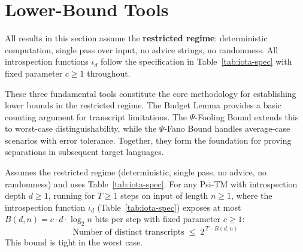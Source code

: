 
\section{Lower-Bound Tools}
\label{sec:lower-bound-tools}

\begin{remark}
All results in this section assume the \textbf{restricted regime}: deterministic computation, single pass over input, no advice strings, no randomness. All introspection functions $\iota_d$ follow the specification in Table~\ref{tab:iota-spec} with fixed parameter $c \geq 1$ throughout.
\end{remark}

These three fundamental tools constitute the core methodology for establishing lower bounds in the restricted regime. The Budget Lemma provides a basic counting argument for transcript limitations. The $\Psi$-Fooling Bound extends this to worst-case distinguishability, while the $\Psi$-Fano Bound handles average-case scenarios with error tolerance. Together, they form the foundation for proving separations in subsequent target languages.

\begin{lemma}
\label{lem:budget}\label{Lk:budget-lemma}\label{lemma:budget-9-2}
Assumes the restricted regime (deterministic, single pass, no advice, no randomness) and uses Table~\ref{tab:iota-spec}.
For any Psi-TM with introspection depth $d \geq 1$, running for $T \geq 1$ steps on input of length $n \geq 1$, where the introspection function $\iota_d$ (Table~\ref{tab:iota-spec}) exposes at most $B(d,n) = c \cdot d \cdot \log_{2} n$ bits per step with fixed parameter $c \geq 1$:
\begin{equation}
\label{eq:budget-bound}
\text{Number of distinct transcripts} \;\leq\; 2^{\,T\,\cdot\, B(d,n)}
\end{equation}
This bound is tight in the worst case.
\end{lemma}


